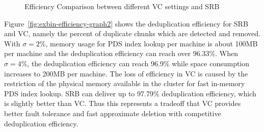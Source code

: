 \begin{figure}[]
    \centering
    \caption{Efficiency Comparison between different VC settings and SRB}
    \label{tab:efficiency-comparison}
\end{figure}

Figure~\ref{fig:exbin-efficiency-graph2} shows the deduplication efficiency for SRB and VC,
namely the percent of duplicate chunks
which are detected and removed.
With $\sigma=2\%$, memory usage for PDS index lookup per machine is about 100MB per machine
and  the deduplication efficiency can reach over 96.33\%.
When $\sigma=4\%$, the deduplication efficiency can reach 96.9\% while space consumption increases to 200MB per machine. 
The loss of efficiency in VC is caused by the restriction of the physical memory available
in the cluster for fast in-memory PDS index lookup. 
SRB can deliver up to 97.79\% deduplication efficiency, which is slightly better than VC.
Thus this represents a tradeoff that VC provides better fault tolerance and fast approximate deletion
with competitive deduplication efficiency.


